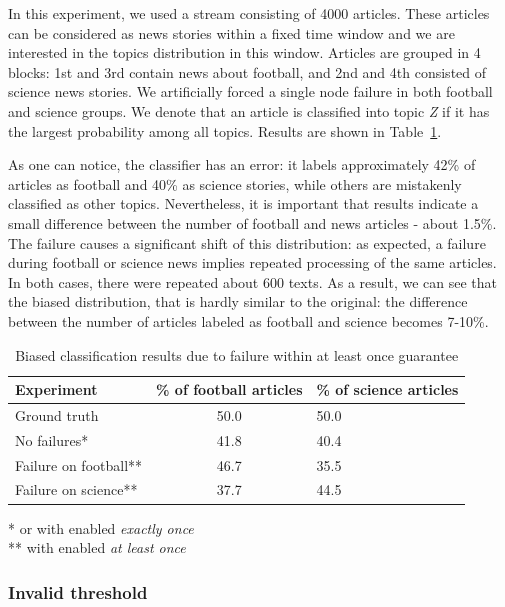 In this experiment, we used a stream consisting of 4000 articles. These articles can be considered as news stories within a fixed time window and we are interested in the topics distribution in this window. Articles are grouped in 4 blocks: 1st and 3rd contain news about football, and 2nd and 4th consisted of science news stories. We artificially forced a  single node failure in both football and science groups. We denote that an article is classified into topic {\em Z} if it has the largest probability among all topics. Results are shown in Table~\ref{biased_results}.

 As one can notice, the classifier has an error: 
it labels approximately 42\% of articles as football and 40\% as science stories, while others are mistakenly classified as other topics. Nevertheless, it is important that results indicate a small difference between the number of football and news articles - about 1.5\%. The failure causes a significant shift of this distribution: as expected, a failure during football or science news implies repeated processing of the same articles. In both cases, there were repeated about 600 texts. As a result, we can see that the biased distribution, that is hardly similar to the original: the difference between the number of articles labeled as football and science becomes 7-10\%. 

\begin{table}[htbp]
\caption{Biased classification results due to failure within at least once guarantee}
\begin{threeparttable}
\begin{tabular}{lcl}
Experiment    & \% of football articles & \% of science articles    \\
\hline
Ground truth   &   50.0    &   50.0    \\
No failures*   &   41.8    &   40.4    \\
Failure on football**   &   46.7    &   35.5    \\
Failure on science**   &   37.7    &   44.5    \\
\end{tabular}
* or with enabled {\em exactly once} \\
** with enabled {\em at least once}
\end{threeparttable}
\label{biased_results}
\end{table}

\subsubsection{Invalid threshold}


